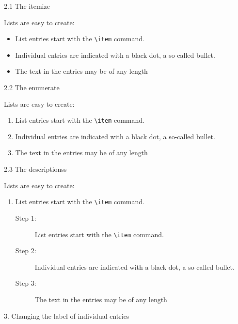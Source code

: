 \documentclass{book}
\begin{document}
\large 2.1 The itemize

 \normalsize Lists are easy to create:
      \begin{itemize}
      
        \item List entries start with the \verb|\item| command.
        \item Individual entries are indicated with a black dot, a so-called bullet.
        \item The text in the entries may be of any length
      \end{itemize}
      
      \large 2.2 The enumerate

 \normalsize Lists are easy to create:
      \begin{enumerate}
      
        \item List entries start with the \verb|\item| command.
        \item Individual entries are indicated with a black dot, a so-called bullet.
        \item The text in the entries may be of any length
      \end{enumerate}
      
      \large 2.3 The descriptionss

 \normalsize Lists are easy to create:
      \begin{enumerate}
 \item List entries start with the \verb|\item| command.
            
       \begin{description}
       \item[Step 1:] List entries start with the \verb|\item| command.
        \item[Step 2:] Individual entries are indicated with a black dot, a so-called bullet.
        \item[Step 3:] The text in the entries may be of any length
      \end{description}
      
      \end{enumerate}

\noindent
\huge 3. Changing the label of individual entries
      
      
      
        
      
\end{document}
